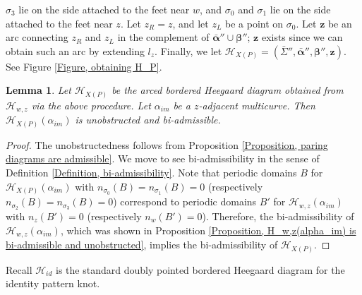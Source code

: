 \documentclass{amsart}
\newtheorem{lem}[thm]{Lemma}
\theoremstyle{definition}
\theoremstyle{remark}
\numberwithin{equation}{section}
\numberwithin{equation}{section} \makeatletter
\begin{document}
$\sigma_3$ lie on the side attached to the feet near $w$, and $\sigma_0$ and $\sigma_1$ lie on the side attached to the feet near $z$. Let $z_R=z$, and let $z_L$ be a point on $\sigma_0$.  Let $\bm{z}$ be an arc connecting $z_R$ and $z_L$ in the complement of $\bm{\bar{\alpha}}'' \cup \bm{\beta}''$; $\bm{z}$ exists since we can obtain such an arc by extending $l_z$. Finally, we let $\mathcal{H}_{X(P)}=(\bar{\Sigma}'',\bm{\bar{\alpha}}'',\bm{\beta}'',\bm{z})$. See Figure \ref{Figure, obtaining H_P}.

 
\begin{lem}\label{Lemma, bi-admissibility of H_P(alpha_im)}
Let $\mathcal{H}_{X(P)}$ be the arced bordered Heegaard diagram obtained from $\mathcal{H}_{w,z}$ via the above procedure. Let $\alpha_{im}$ be a $z$-adjacent multicurve. Then $\mathcal{H}_{X(P)}(\alpha_{im})$ is unobstructed and bi-admissible.
\end{lem}
\begin{proof}
The unobstructedness follows from Proposition \ref{Proposition, paring diagrams are admissible}. We move to see bi-admissibility in the sense of Definition \ref{Definition, bi-admissibility}. Note that periodic domains $B$ for $\mathcal{H}_{X(P)}(\alpha_{im})$ with $n_{\sigma_0}(B)=n_{\sigma_1}(B)=0$ (respectively $n_{\sigma_2}(B)=n_{\sigma_3}(B)=0$) correspond to periodic domains $B'$ for $\mathcal{H}_{w,z}(\alpha_{im})$ with $n_z(B')=0$ (respectively $n_w(B')=0$). Therefore, the bi-admissibility of $\mathcal{H}_{w,z}(\alpha_{im})$, which was shown in Proposition \ref{Proposition, H_w,z(alpha_im) is bi-admissible and unobstructed}, implies the bi-admissibility of $\mathcal{H}_{X(P)}$.  
\end{proof}

Recall $\mathcal{H}_{id}$ is the standard doubly pointed bordered Heegaard diagram for the identity pattern knot. 
\end{document}
